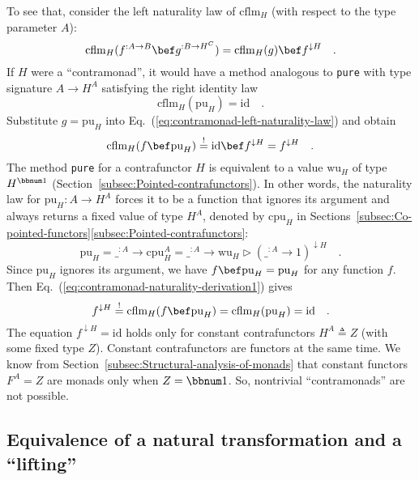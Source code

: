 To see that, consider the left naturality law of $\text{cflm}_{H}$
(with respect to the type parameter $A$):
\begin{equation}
\text{cflm}_{H}(f^{:A\rightarrow B}\bef g^{:B\rightarrow H^{C}})=\text{cflm}_{H}(g)\bef f^{\downarrow H}\quad.\label{eq:contramonad-left-naturality-law}
\end{equation}
If $H$ were a \textsf{``}contramonad\textsf{''}, it would have a method analogous
to \lstinline!pure! with type signature $A\rightarrow H^{A}$ satisfying
the right identity law
\[
\text{cflm}_{H}(\text{pu}_{H})=\text{id}\quad.
\]
Substitute $g=\text{pu}_{H}$ into Eq.~(\ref{eq:contramonad-left-naturality-law})
and obtain
\begin{equation}
\text{cflm}_{H}(f\bef\text{pu}_{H})\overset{!}{=}\text{id}\bef f^{\downarrow H}=f^{\downarrow H}\quad.\label{eq:contramonad-naturality-derivation1}
\end{equation}
The method \lstinline!pure! for a contrafunctor $H$ is equivalent
to a value $\text{wu}_{H}$ of type $H^{\bbnum 1}$ (Section~\ref{subsec:Pointed-contrafunctors}).
In other words, the naturality law for $\text{pu}_{H}:A\rightarrow H^{A}$
forces it to be a function that ignores its argument and always returns
a fixed value of type $H^{A}$, denoted by $\text{cpu}_{H}$ in Sections~\ref{subsec:Co-pointed-functors}\textendash \ref{subsec:Pointed-contrafunctors}:
\[
\text{pu}_{H}=\_^{:A}\rightarrow\text{cpu}_{H}^{A}=\_^{:A}\rightarrow\text{wu}_{H}\triangleright(\_^{:A}\rightarrow1)^{\downarrow H}\quad.
\]
Since $\text{pu}_{H}$ ignores its argument, we have $f\bef\text{pu}_{H}=\text{pu}_{H}$
for any function $f$. Then Eq.~(\ref{eq:contramonad-naturality-derivation1})
gives
\[
f^{\downarrow H}\overset{!}{=}\text{cflm}_{H}(f\bef\text{pu}_{H})=\text{cflm}_{H}(\text{pu}_{H})=\text{id}\quad.
\]
The equation $f^{\downarrow H}=\text{id}$ holds only for constant
contrafunctors $H^{A}\triangleq Z$ (with some fixed type $Z$). Constant
contrafunctors are functors at the same time. We know from Section~\ref{subsec:Structural-analysis-of-monads}
that constant functors $F^{A}=Z$ are monads only when $Z=\bbnum 1$.
So, nontrivial \textsf{``}contramonads\textsf{''} are not possible. 

\subsection{Equivalence of a natural transformation and a \textsf{``}lifting\textsf{''}}

